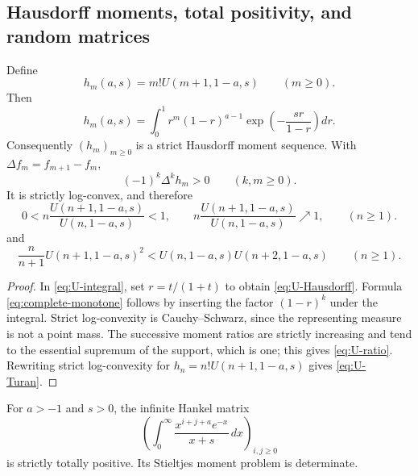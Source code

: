 \subsection{Hausdorff moments, total positivity, and random matrices}

\begin{proposition}
\label{prop:U-Hausdorff}
Define
\[
 h_m(a,s)=m!U(m+1,1-a,s)\qquad(m\geq0).
\]
Then
\begin{equation}
 \boxed{
 h_m(a,s)=\int_0^1 r^m(1-r)^{a-1}
 \exp\left(-\frac{sr}{1-r}\right)dr.}
 \label{eq:U-Hausdorff}
\end{equation}
Consequently \((h_m)_{m\geq0}\) is a strict Hausdorff moment sequence.  With
\(\Delta f_m=f_{m+1}-f_m\),
\begin{equation}
 (-1)^k\Delta^kh_m>0\qquad(k,m\geq0).
 \label{eq:complete-monotone}
\end{equation}
It is strictly log-convex, and therefore
\begin{equation}
0<n\frac{U(n+1,1-a,s)}{U(n,1-a,s)}<1,
\qquad
n\frac{U(n+1,1-a,s)}{U(n,1-a,s)}\nearrow1,
\qquad(n\geq1).
\label{eq:U-ratio}
\end{equation}
and
\begin{equation}
 \frac{n}{n+1}U(n+1,1-a,s)^2
 <U(n,1-a,s)U(n+2,1-a,s)
 \qquad(n\geq1).
 \label{eq:U-Turan}
\end{equation}
\end{proposition}

\begin{proof}
In \eqref{eq:U-integral}, set \(r=t/(1+t)\) to obtain
\eqref{eq:U-Hausdorff}.  Formula \eqref{eq:complete-monotone} follows by
inserting the factor \((1-r)^k\) under the integral.  Strict log-convexity is
Cauchy--Schwarz, since the representing measure is not a point mass.  The
successive moment ratios are strictly increasing and tend to the essential
supremum of the support, which is one; this gives \eqref{eq:U-ratio}.
Rewriting strict log-convexity for \(h_n=n!U(n+1,1-a,s)\) gives
\eqref{eq:U-Turan}.
\end{proof}

\begin{proposition}
\label{prop:Laguerre-total-positive}
For \(a>-1\) and \(s>0\), the infinite Hankel matrix
\[
 \left(\int_0^\infty\frac{x^{i+j+a}e^{-x}}{x+s}\,dx\right)_{i,j\geq0}
\]
is strictly totally positive.  Its Stieltjes moment problem is determinate.
\end{proposition}

